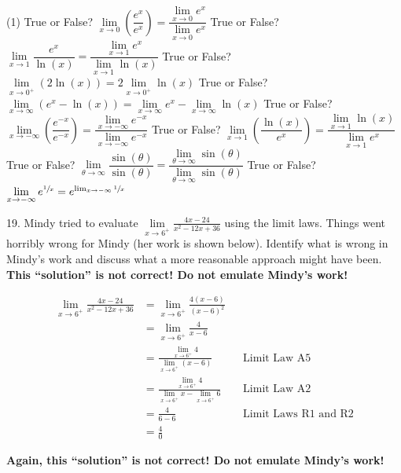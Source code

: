 \documentclass[10pt,oneside,]{book}
\theoremstyle{plain}
\theoremstyle{definition}
\numberwithin{equation}{section}
\newcommand{\fe}[2]{#1\mathopen{}\left(#2\right)\mathclose{}}
\begin{document}
\begin{exerciselist}
\par
\begin{exercisegroup}(1)
\exercise[11.]\hypertarget{exercise-hear-me-first}{\null}True or False? \(\lim\limits_{x\to0}\left(\dfrac{e^x}{e^x}\right)=\dfrac{\lim\limits_{x\to0}e^x}{\lim\limits_{x\to0}e^x}\)%
\exercise[12.]\hypertarget{exercise-101}{\null}True or False? \(\lim\limits_{x\to1}\dfrac{e^x}{\fe{\ln}{x}}=\dfrac{\lim\limits_{x\to1}e^x}{\lim\limits_{x\to1}\fe{\ln}{x}}\)%
\exercise[13.]\hypertarget{exercise-102}{\null}True or False? \(\lim\limits_{x\to0^{+}}\left(2\fe{\ln}{x}\right)=2\lim\limits_{x\to0^{+}}\fe{\ln}{x}\)%
\exercise[14.]\hypertarget{exercise-103}{\null}True or False? \(\lim\limits_{x\to\infty}\left(e^x-\fe{\ln}{x}\right)=\lim\limits_{x\to\infty}e^x-\lim\limits_{x\to\infty}\fe{\ln}{x}\)%
\exercise[15.]\hypertarget{exercise-104}{\null}True or False? \(\lim\limits_{x\to-\infty}\left(\dfrac{e^{-x}}{e^{-x}}\right)=\dfrac{\lim\limits_{x\to-\infty}e^{-x}}{\lim\limits_{x\to-\infty}e^{-x}}\)%
\exercise[16.]\hypertarget{exercise-105}{\null}True or False? \(\lim\limits_{x\to1}\left(\dfrac{\fe{\ln}{x}}{e^x}\right)=\dfrac{\lim\limits_{x\to1}\fe{\ln}{x}}{\lim\limits_{x\to1}e^x}\)%
\exercise[17.]\hypertarget{exercise-106}{\null}True or False? \(\lim\limits_{\theta\to\infty}\dfrac{\fe{\sin}{\theta}}{\fe{\sin}{\theta}}=\dfrac{\lim\limits_{\theta\to\infty}\fe{\sin}{\theta}}{\lim\limits_{\theta\to\infty}\fe{\sin}{\theta}}\)%
\exercise[18.]\hypertarget{exercise-hear-me-last}{\null}True or False? \(\lim\limits_{x\to-\infty}e^{\sfrac{1}{x}}=e^{\lim_{x\to-\infty}\sfrac{1}{x}}\)%
\end{exercisegroup}
\par\smallskip\noindent
\item[19.]\hypertarget{exercise-108}{\null}Mindy tried to evaluate \(\lim\limits_{x\to6^{+}}\frac{4x-24}{x^2-12x+36}\) using the limit laws. Things went horribly wrong for Mindy (her work is shown below). Identify what is wrong in Mindy's work and discuss what a more reasonable approach might have been. \textbf{This ``solution'' is not correct! Do not emulate Mindy's work!}%
\par
\begin{align*}
\lim_{x\to6^{+}}\frac{4x-24}{x^2-12x+36}&=\lim_{x\to6^{+}}\frac{4(x-6)}{(x-6)^2}\\
&=\lim_{x\to6^{+}}\frac{4}{x-6}\\
&=\frac{\lim\limits_{x\to6^{+}}4}{\lim\limits_{x\to6^{+}}(x-6)}&&\text{Limit Law A5}\\
&=\frac{\lim\limits_{x\to6^{+}}4}{\lim\limits_{x\to6^{+}}x-\lim\limits_{x\to6^{+}}6}&&\text{Limit Law A2}\\
&=\frac{4}{6-6}&&\text{Limit Laws R1 and R2}\\
&=\frac{4}{0}
\end{align*}%
\par
\textbf{Again, this ``solution'' is not correct! Do not emulate Mindy's work!}%
\par\smallskip
\end{exerciselist}
\typeout{************************************************}
\typeout{************************************************}
\end{document}
